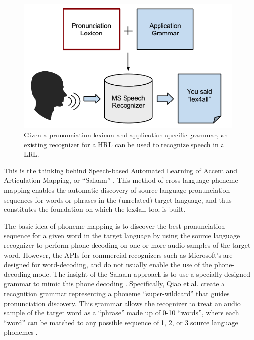 \documentclass[11pt]{article}
\begin{document}
\begin{figure}[tb]
\begin{center}
\includegraphics[width=\columnwidth]{../img/background-diagram-cropped.png}
\caption{Given a pronunciation lexicon and application-specific grammar, an existing recognizer for a HRL can be used to recognize speech in a LRL.\label{fig:background}}
\end{center}
\end{figure}



This is the thinking behind Speech-based Automated Learning of Accent and Articulation Mapping, or ``Salaam'' \cite{Sherwani09,Qiao10,Chan12}. This method of cross-language phoneme-mapping enables the automatic discovery of source-language pronunciation sequences for words or phrases in the (unrelated) target language, and thus constitutes the foundation on which the lex4all tool is built.

The basic idea of phoneme-mapping is to discover the best pronunciation sequence for a given word in the target language by using the source language recognizer to perform phone decoding on one or more audio samples of the target word. However, the APIs for commercial recognizers such as Microsoft's are designed for word-decoding, and do not usually enable the use of the phone-decoding mode. The insight of the Salaam approach is to use a specially designed grammar to mimic this phone decoding \cite[\S3.2]{Chan12}. 
Specifically, Qiao et al. \cite[§4.1]{Qiao10} create a recognition grammar representing a phoneme ``super-wildcard'' that guides pronunciation discovery. 
This grammar allows the recognizer to treat an audio sample of the target word as a ``phrase'' made up of 0-10 ``words'',
where each ``word'' can be matched to any possible sequence of 1, 2, or 3 source language phonemes \cite[§4.1]{Qiao10}. 
\end{document}
